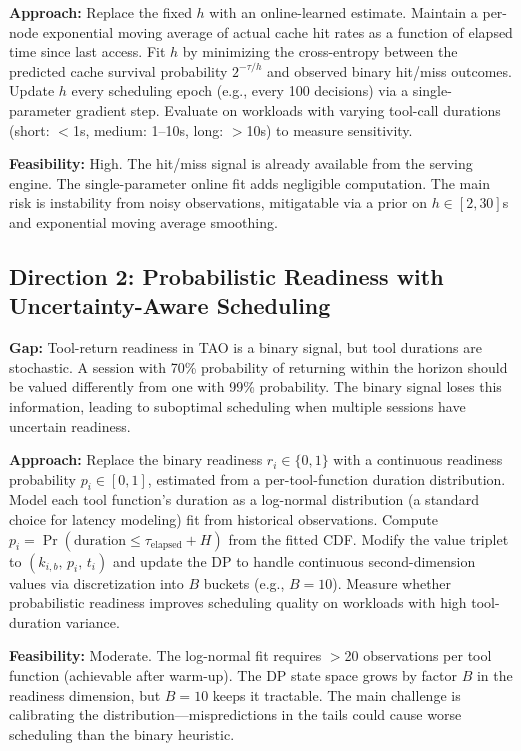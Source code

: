 \documentclass[11pt,a4paper]{article}
\begin{document}
\textbf{Approach:} Replace the fixed $h$ with an online-learned estimate. Maintain a per-node exponential moving average of actual cache hit rates as a function of elapsed time since last access. Fit $h$ by minimizing the cross-entropy between the predicted cache survival probability $2^{-\tau/h}$ and observed binary hit/miss outcomes. Update $h$ every scheduling epoch (e.g., every 100 decisions) via a single-parameter gradient step. Evaluate on workloads with varying tool-call durations (short: $<$1s, medium: 1--10s, long: $>$10s) to measure sensitivity.

\textbf{Feasibility:} High. The hit/miss signal is already available from the serving engine. The single-parameter online fit adds negligible computation. The main risk is instability from noisy observations, mitigatable via a prior on $h \in [2, 30]$s and exponential moving average smoothing.

\subsection{Direction 2: Probabilistic Readiness with Uncertainty-Aware Scheduling}
\textbf{Gap:} Tool-return readiness in TAO is a binary signal, but tool durations are stochastic. A session with 70\% probability of returning within the horizon should be valued differently from one with 99\% probability. The binary signal loses this information, leading to suboptimal scheduling when multiple sessions have uncertain readiness.

\textbf{Approach:} Replace the binary readiness $r_i \in \{0, 1\}$ with a continuous readiness probability $p_i \in [0, 1]$, estimated from a per-tool-function duration distribution. Model each tool function's duration as a log-normal distribution (a standard choice for latency modeling) fit from historical observations. Compute $p_i = \Pr(\text{duration} \leq \tau_{\text{elapsed}} + H)$ from the fitted CDF. Modify the value triplet to $(k_{i,b},\, p_i,\, t_i)$ and update the DP to handle continuous second-dimension values via discretization into $B$ buckets (e.g., $B = 10$). Measure whether probabilistic readiness improves scheduling quality on workloads with high tool-duration variance.

\textbf{Feasibility:} Moderate. The log-normal fit requires $>$20 observations per tool function (achievable after warm-up). The DP state space grows by factor $B$ in the readiness dimension, but $B = 10$ keeps it tractable. The main challenge is calibrating the distribution---mispredictions in the tails could cause worse scheduling than the binary heuristic.
\end{document}
